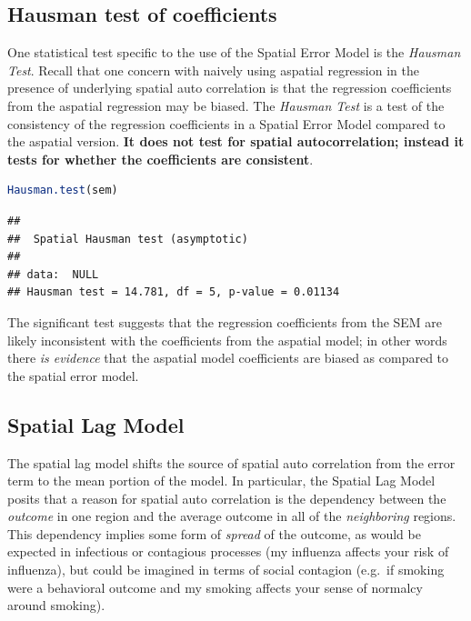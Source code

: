 \documentclass[
]{book}
\begin{document}
\hypertarget{hausman-test-of-coefficients}{%
\subsection{Hausman test of coefficients}\label{hausman-test-of-coefficients}}

One statistical test specific to the use of the Spatial Error Model is the \emph{Hausman Test}. Recall that one concern with naively using aspatial regression in the presence of underlying spatial auto correlation is that the regression coefficients from the aspatial regression may be biased. The \emph{Hausman Test} is a test of the consistency of the regression coefficients in a Spatial Error Model compared to the aspatial version. \textbf{It does not test for spatial autocorrelation; instead it tests for whether the coefficients are consistent}.

\begin{lstlisting}[language=R]
Hausman.test(sem)
\end{lstlisting}

\begin{lstlisting}
## 
## 	Spatial Hausman test (asymptotic)
## 
## data:  NULL
## Hausman test = 14.781, df = 5, p-value = 0.01134
\end{lstlisting}

The significant test suggests that the regression coefficients from the SEM are likely inconsistent with the coefficients from the aspatial model; in other words there \emph{is evidence} that the aspatial model coefficients are biased as compared to the spatial error model.

\hypertarget{spatial-lag-model}{%
\subsection{Spatial Lag Model}\label{spatial-lag-model}}

The spatial lag model shifts the source of spatial auto correlation from the error term to the mean portion of the model. In particular, the Spatial Lag Model posits that a reason for spatial auto correlation is the dependency between the \emph{outcome} in one region and the average outcome in all of the \emph{neighboring} regions. This dependency implies some form of \emph{spread} of the outcome, as would be expected in infectious or contagious processes (my influenza affects your risk of influenza), but could be imagined in terms of social contagion (e.g.~if smoking were a behavioral outcome and my smoking affects your sense of normalcy around smoking).
\end{document}

